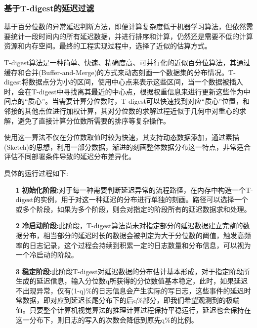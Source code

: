 \documentclass[master]{shtthesis}
\begin{document}
\subsubsection{基于T-digest的延迟过滤}\label{基于T-digest的延迟过滤}
基于百分位数的异常延迟判断方法，即便计算复杂度低于机器学习算法，但依然需要统计一段时间内的所有延迟数据，并进行排序和计算，仍然还是需要不低的计算资源和内存空间。最终的工程实现过程中，选择了近似的估算方式。

T-digest\cite{dunning2019computing}算法是一种简单、快速、精确度高、可并行化的近似百分位算法，其通过缓存和合并(Buffer-and-Merge)的方式来动态刻画一个数据集的分布情况。T-digest将数据点分为小的区间，使用中心点来表示这些区间，当一个数据被插入时，会在T-digest中寻找离其最近的中心点，根据权重信息来进行更新这些作为中间点的“质心”。当需要计算分位数时，T-digest可以快速找到对应“质心”位置，和邻接的其他点位进行加权计算，其对分位数的求解过程近似于几何中对重心的求解，避免了直接计算分位数所需要的排序等复杂操作。

使用这一算法不仅在分位数取值时较为快速，其支持动态数据添加，通过素描(Sketch)的思想，利用一部分数据，渐进的刻画整体数据分布这一特点，非常适合评估不同部署条件导致的延迟分布差异化。
\par
具体的运行过程如下:
\begin{itemize}
	\item[\textbf{1}] \textbf{初始化阶段:}对于每一种需要判断延迟异常的流程路径，在内存中构造一个T-digest的实例，用于对这一种延迟的分布进行单独的刻画。路径可以选择一个或多个阶段，如果为多个阶段，则会对指定的阶段所有的延迟数据求和处理。
	\item[\textbf{2}] \textbf{冷启动阶段:}此阶段，T-digest算法尚未对指定部分的延迟数据建立完整的数据分布，相当部分的延迟时长的数据会被判定为大于分位数的阈值，触发高频率的日志记录，这个过程会持续到积累一定的日志数量和分布信息，可以视为一个冷启动的阶段。
	\item[\textbf{3}] \textbf{稳定阶段:}此阶段T-digest对延迟数据的分布估计基本形成，对于指定阶段所生成的延迟信息，输入分位数q所获得的分位数值基本稳定，此时，如果延迟不出现异常，仅有(1-q)$\%$的日志信息会产生实际的写日志，这些事件的延迟时常数据，即对应到延迟长尾分布下的后q$\%$部分，即我们希望观测到的极端值。只要整个计算机视觉算法的推理计算过程保持平稳运行，延迟也会保持在这一分布下，则日志的写入的次数会降低到原先q$\%$的比例。
\end{itemize}
\end{document}
